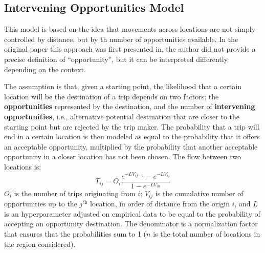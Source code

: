 \subsection{Intervening Opportunities Model}
This model is based on the idea that movements across locations are not simply controlled by distance, but by th number of opportunities available. In the original paper this approach was first presented in, the author did not provide a precise definition of ``opportunity'', but it can be interpreted differently depending on the context.

The assumption is that, given a starting point, the likelihood that a certain location will be the destination of a trip depends on two factors: the \textbf{opportunities} represented by the destination, and the number of \textbf{intervening opportunities}, i.e., alternative potential destination that are closer to the starting point but are rejected by the trip maker. The probability that a trip will end in a certain location is then modeled as equal to the probability that it offers an acceptable opportunity, multiplied by the probability that another acceptable opportunity in a closer location has not been chosen. The flow between two locations is:
\begin{equation*}
    T_{ij} = O_i \frac{e^{-L V_{ij-1}} - e^{-L V_{ij}}}{1 - e^{-L V_{in}}}
\end{equation*}
$O_i$ is the number of trips originating from $i$; $V_{ij}$ is the cumulative number of opportunities up to the $j^{\text{th}}$ location, in order of distance from the origin $i$, and $L$ is an hyperparameter adjusted on empirical data to be equal to the probability of accepting an opportunity destination. The denominator is a normalization factor that ensures that the probabilities sum to 1 ($n$ is the total number of locations in the region considered).


